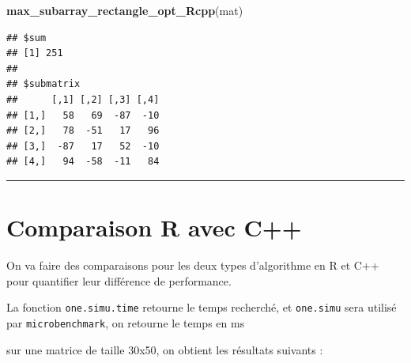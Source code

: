 \documentclass[
]{article}
\newenvironment{Shaded}{\begin{snugshade}}{\end{snugshade}}
\newcommand{\FunctionTok}[1]{\textcolor[rgb]{0.13,0.29,0.53}{\textbf{#1}}}
\newcommand{\NormalTok}[1]{#1}
\begin{document}
\begin{Shaded}
\begin{Highlighting}[]
\FunctionTok{max\_subarray\_rectangle\_opt\_Rcpp}\NormalTok{(mat)}
\end{Highlighting}
\end{Shaded}

\begin{verbatim}
## $sum
## [1] 251
## 
## $submatrix
##      [,1] [,2] [,3] [,4]
## [1,]   58   69  -87  -10
## [2,]   78  -51   17   96
## [3,]  -87   17   52  -10
## [4,]   94  -58  -11   84
\end{verbatim}

\begin{center}\rule{0.5\linewidth}{0.5pt}\end{center}

\section{Comparaison R avec C++}\label{comparaison-r-avec-c}

On va faire des comparaisons pour les deux types d'algorithme en R et
C++ pour quantifier leur différence de performance.

La fonction \texttt{one.simu.time} retourne le temps recherché, et
\texttt{one.simu} sera utilisé par \texttt{microbenchmark}, on retourne
le temps en ms

sur une matrice de taille 30x50, on obtient les résultats suivants :
\end{document}
